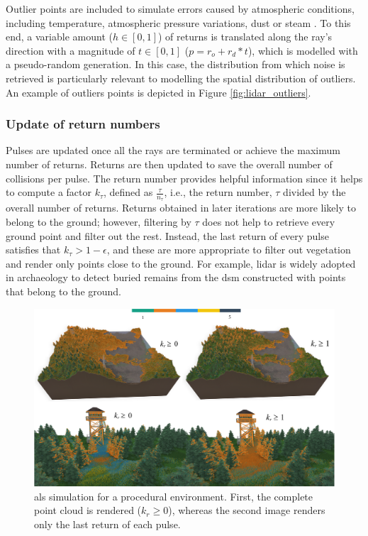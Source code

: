 Outlier points are included to simulate errors caused by atmospheric conditions, including temperature, atmospheric pressure variations, dust or steam \cite{boehler_investigating_2018}. To this end, a variable amount ($h \in [0, 1]$) of returns is translated along the ray's direction with a magnitude of $t \in [0, 1]$ ($p = r_o + r_d * t$), which is modelled with a pseudo-random generation. In this case, the distribution from which noise is retrieved is particularly relevant to modelling the spatial distribution of outliers. An example of outliers points is depicted in Figure \ref{fig:lidar_outliers}.

\subsubsection{Update of return numbers}

Pulses are updated once all the rays are terminated or achieve the maximum number of returns. Returns are then updated to save the overall number of collisions per pulse. The return number provides helpful information since it helps to compute a factor $k_{\tau}$, defined as $\frac{\tau}{n_{\tau}}$, i.e., the return number, $\tau$ divided by the overall number of returns. Returns obtained in later iterations are more likely to belong to the ground; however, filtering by $\tau$ does not help to retrieve every ground point and filter out the rest. Instead, the last return of every pulse satisfies that $k_{\tau} > 1 - \epsilon$, and these are more appropriate to filter out vegetation and render only points close to the ground. For example, \acrshort{lidar} is widely adopted in archaeology to detect buried remains from the \acrshort{dsm} constructed with points that belong to the ground. 

\begin{figure}[ht]
	\centering
	\includegraphics[width=1\linewidth]{figs/lidar_simulation/tls_multiple_returns.png}
	\caption{\acrshort{als} simulation for a procedural environment. First, the complete point cloud is rendered ($k_{r} \geq 0$), whereas the second image renders only the last return of each pulse.}
	\label{fig:multiple_returns}
\end{figure}


